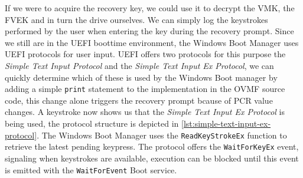 If we were to acquire the recovery key, we could use it to decrypt the \ac{VMK}, the \ac{FVEK} and in turn the drive ourselves. We can simply log the keystrokes performed by the user when entering the key during the recovery prompt. Since we still are in the \ac{UEFI} boottime environment, the Windows Boot Manager uses \ac{UEFI} protocols for user input. \ac{UEFI} offers two protocols for this purpose the \emph{Simple Text Input Protocol} and the \emph{Simple Text Input Ex Protocol}, we can quickly determine which of these is used by the Windows Boot manager by adding a simple \lstinline{print} statement to the implementation in the \ac{OVMF} source code, this change alone triggers the recovery prompt bcause of \ac{PCR} value changes. A keystroke now shows us that the \emph{Simple Text Input Ex Protocol} is being used, the protocol structure is depicted in \autoref{lst:simple-text-input-ex-protocol}. The Windows Boot Manager uses the \lstinline{ReadKeyStrokeEx} function to retrieve the latest pending keypress. The protocol offers the \lstinline{WaitForKeyEx} event, signaling when keystrokes are available, execution can be blocked until this event is emitted with the \lstinline{WaitForEvent} Boot service.




